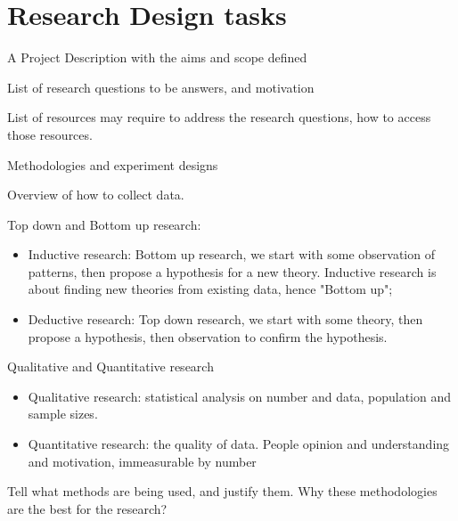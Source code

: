 \section{Research Design tasks}
\begin{todolist}
    \item[\done] A Project Description with the aims and scope defined
    \item[\done] List of research questions to be answers, and motivation
    \item[\done] List of resources may require to address the research questions, how to access those resources.
    \item[\done] Methodologies and experiment designs
    \item[\done] Overview of how to collect data.
\end{todolist}

Top down and Bottom up research:
\begin{itemize}
    \item Inductive research: Bottom up research, we start with some observation of patterns, then propose a hypothesis for a new theory. Inductive research is about finding new theories from existing data, hence "Bottom up";
    \item Deductive research: Top down research, we start with some theory, then propose a hypothesis, then observation to confirm the hypothesis.
\end{itemize}

Qualitative and Quantitative research
\begin{itemize}
    \item Qualitative research: statistical analysis on number and data, population and sample sizes.
    \item Quantitative research: the quality of data. People opinion and understanding and motivation, immeasurable by number
\end{itemize}

Tell what methods are being used, and justify them.
Why these methodologies are the best for the research?

